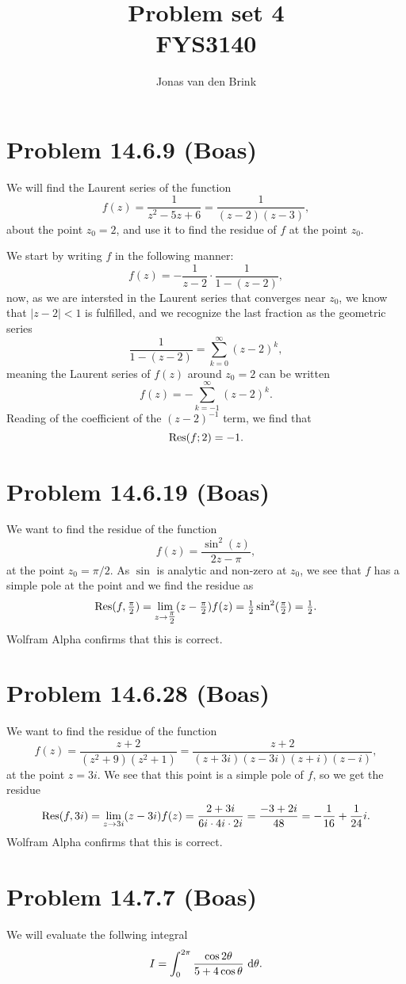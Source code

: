 \documentclass[a4paper, 11pt, titlepage, english]{article}
\author{Jonas van den Brink}
\title{Problem set 4 \\ FYS3140}
\begin{document}
\maketitle
% 

\section*{Problem 14.6.9 (Boas)}
We will find the Laurent series of the function
$$f(z) = \frac{1}{z^2-5z+6} = \frac{1}{(z-2)(z-3)},$$
about the point $z_0=2$, and use it to find the residue of $f$ at the point $z_0$.

We start by writing $f$ in the following manner:
$$f(z) = -\frac{1}{z-2}\cdot\frac{1}{1-(z-2)},$$
now, as we are intersted in the Laurent series that converges near $z_0$, we know that $|z-2|<1$ is fulfilled, and we recognize the last fraction as the geometric series
$$\frac{1}{1-(z-2)} = \sum_{k=0}^\infty (z-2)^k,$$
meaning the Laurent series of $f(z)$ around $z_0 = 2$ can be written
$$f(z) = -\sum_{k=-1}^\infty(z-2)^k.$$
Reading of the coefficient of the $(z-2)^{-1}$ term, we find that
$${\rm Res}(f;2) = -1.$$

\section*{Problem 14.6.19 (Boas)}
We want to find the residue of the function
$$f(z) = \frac{\sin^2(z)}{2z-\pi},$$
at the point $z_0 = \pi/2$. As $\sin$ is analytic and non-zero at $z_0$, we see that $f$ has a simple pole at the point and we find the residue as
$${\rm Res}(f,\tfrac{\pi}{2}) = \lim_{z\to\tfrac{\pi}{2}}(z-\tfrac{\pi}{2}) f(z) = \tfrac{1}{2}\sin^2 (\tfrac{\pi}{2}) = \tfrac{1}{2}.$$
Wolfram Alpha confirms that this is correct.

\section*{Problem 14.6.28 (Boas)}
We want to find the residue of the function 
$$f(z) = \frac{z + 2}{(z^2 + 9)(z^2 + 1)} = \frac{z+2}{(z+3i)(z-3i)(z+i)(z-i)},$$
at the point $z = 3i$. We see that this point is a simple pole of $f$, so we get the residue
$${\rm Res}(f,3i) = \lim_{z \to 3i} (z-3i)f(z) = \frac{2 + 3i}{6i\cdot 4i \cdot 2i} = \frac{-3 + 2i}{48} = -\frac{1}{16} + \frac{1}{24}i.$$
Wolfram Alpha confirms that this is correct.

\section*{Problem 14.7.7 (Boas)}
We will evaluate the follwing integral
$$I = \int_0^{2\pi} \frac{\cos 2\theta}{5+4\cos\theta} {\rm\ d}\theta.$$
\end{document}

